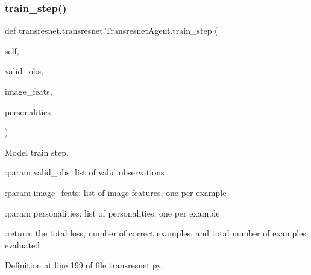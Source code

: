 \subsubsection{\texorpdfstring{train\+\_\+step()}{train\_step()}}
{\footnotesize\ttfamily def transresnet.\+transresnet.\+Transresnet\+Agent.\+train\+\_\+step (\begin{DoxyParamCaption}\item[{}]{self,  }\item[{}]{valid\+\_\+obs,  }\item[{}]{image\+\_\+feats,  }\item[{}]{personalities }\end{DoxyParamCaption})}

\begin{DoxyVerb}Model train step.

:param valid_obs:
    list of valid observations

:param image_feats:
    list of image features, one per example

:param personalities:
    list of personalities, one per example

:return:
    the total loss, number of correct examples, and total number of
    examples evaluated
\end{DoxyVerb}
 

Definition at line 199 of file transresnet.\+py.




